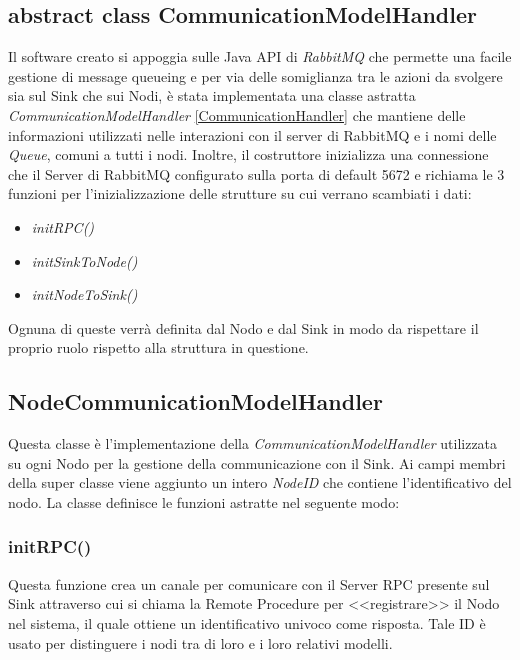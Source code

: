     \subsection{abstract class CommunicationModelHandler}
      Il software creato si appoggia sulle Java API di \textit{RabbitMQ} che permette una facile gestione di message queueing e per via delle somiglianza tra le azioni da svolgere sia sul Sink che sui Nodi, è stata implementata una classe astratta \textit{CommunicationModelHandler} \ref{CommunicationHandler} che mantiene delle informazioni utilizzati nelle interazioni con il server di RabbitMQ e i nomi delle \textit{Queue}, comuni a tutti i nodi. Inoltre, il costruttore inizializza una connessione che il Server di RabbitMQ configurato sulla porta di default 5672 e richiama le 3 funzioni per l'inizializzazione delle strutture su cui verrano scambiati i dati:
      \begin{itemize}
        \item \textit{initRPC()}
        \item \textit{initSinkToNode()}
        \item \textit{initNodeToSink()}
      \end{itemize}
      Ognuna di queste verrà definita dal Nodo e dal Sink in modo da rispettare il proprio ruolo rispetto alla struttura in questione.
      

    \subsection{NodeCommunicationModelHandler}
      Questa classe è l'implementazione della \textit{CommunicationModelHandler} utilizzata su ogni Nodo per la gestione della communicazione con il Sink. Ai campi membri della super classe viene aggiunto un intero \textit{NodeID} che contiene l'identificativo del nodo. La classe definisce le funzioni astratte nel seguente modo:
      \subsubsection{initRPC()}
        Questa funzione crea un canale per comunicare con il Server RPC presente sul Sink attraverso cui si chiama la Remote Procedure per <<registrare>> il Nodo nel sistema, il quale ottiene un identificativo univoco come risposta. Tale ID è usato per distinguere i nodi tra di loro e i loro relativi modelli.
        


